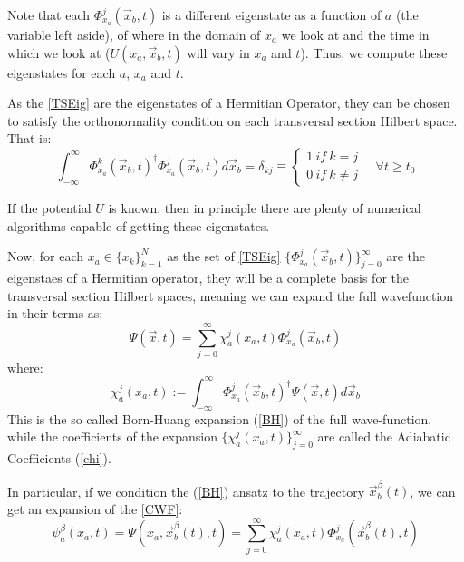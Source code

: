 \documentclass[11pt, a4paper]{article} %
\begin{document}
Note that each $\Phi_{x_a}^j(\vec{x}_b,t)$ is a different eigenstate as a function of $a$ (the variable left aside), of where in the domain of $x_a$ we look at and the time in which we look at ($U(x_a,\vec{x}_b,t)$ will vary in $x_a$ and $t$). Thus, we compute these eigenstates for each $a$, $x_a$ and $t$.

As the \ref{TSEig} are the eigenstates of a Hermitian Operator, they can be chosen to satisfy the orthonormality condition on each transversal section Hilbert space. That is:
$$
\int_{-\infty}^\infty \Phi_{x_a}^k(\vec{x}_b,t)^\dagger \Phi_{x_a}^j(\vec{x}_b,t) d\vec{x}_b=\delta_{kj} \equiv \begin{cases}1\ if\ k=j\\0\ if\ k\neq j \end{cases}\quad \forall t\geq t_0
$$

If the potential $U$ is known, then in principle there are plenty of numerical algorithms capable of getting these eigenstates.

Now, for each $x_a\in\{x_k\}_{k=1}^N$ as the set of \ref{TSEig} $\{\Phi_{x_a}^j(\vec{x}_b,t)\}_{j=0}^\infty$ are the eigenstaes of a Hermitian operator, they will be a complete basis for the transversal section Hilbert spaces, meaning we can expand the full wavefunction in their terms as:
\begin{equation}\label{BH}\tag{BH}
\Psi(\vec{x},t)=\sum_{j=0}^\infty \chi_a^j(x_a,t) \Phi_{x_a}^j(\vec{x}_b,t)
\end{equation}
where:
\begin{equation}\label{chi}\tag{chi}
\chi_a^j(x_a,t):= \int_{-\infty}^\infty \Phi_{x_a}^j(\vec{x}_b,t)^\dagger \Psi(\vec{x},t) d\vec{x}_b
\end{equation}
This is the so called Born-Huang expansion (\ref{BH}) of the full wave-function, while the coefficients of the expansion $\{\chi_a^j(x_a,t)\}_{j=0}^\infty$ are called the Adiabatic Coefficients (\ref{chi}).

In particular, if we condition the (\ref{BH}) ansatz to the trajectory $\vec{x}_b^\beta(t)$, we can get an expansion of the \ref{CWF}:
$$
\psi_a^\beta(x_a,t) = \Psi(x_a, \vec{x}_b^\beta(t), t) = \sum_{j=0}^\infty \chi_a^j(x_a,t) \Phi_{x_a}^j(\vec{x}_b^\beta(t),t)
$$
\end{document}
